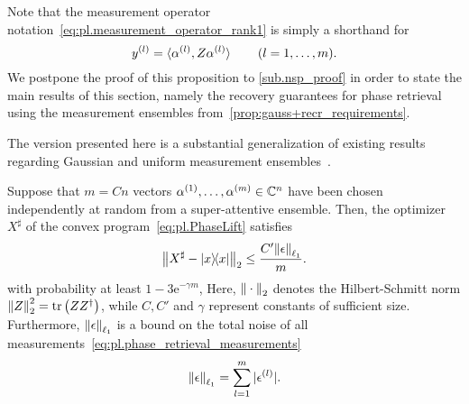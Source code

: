 Note that the measurement operator notation~\eqref{eq:pl.measurement_operator_rank1} is simply a shorthand for
\[
  y^{(l)} = \braket{\alpha^{(l)}, Z\alpha^{(l)}} \quad\quad (l=1,\ldots,m).
\]
We postpone the proof of this proposition to \cref{sub.nsp_proof} in order to state the main results of this section, namely the recovery guarantees for phase retrieval using the measurement ensembles from~\cref{prop:gauss+recr_requirements}.

The version presented here is a substantial generalization of existing results regarding Gaussian and uniform measurement ensembles~\cite{Candes_2012_Solving,Demanet_2014_Stable}.

\begin{theorem}%
  \label{thm:pl.phaselift_noisy}
  Suppose that $m = Cn$ vectors $\alpha^{(1)},\ldots,\alpha^{(m)} \in \mathbb{C}^n$ have been chosen independently at random from a super-attentive ensemble.
  Then, the optimizer $X^\sharp$ of the convex program~\eqref{eq:pl.PhaseLift} satisfies
  \[
    \Fnorm{{X}^\sharp - \ketbra{x}} \leq \frac{C'  \norm{\epsilon}_{\ell_1}}{m}.
    \label{eq:pl.noisy_recovery_bound}
  \]
  with probability at least $1 - 3\mathrm{e}^{-\gamma m}$,
  Here, ${\Vert\cdot\Vert}_{2}$ denotes the Hilbert-Schmitt norm ${\Vert Z\Vert}_{2}^2 = \operatorname{tr} \left( {Z} {Z}^\dagger \right)$, while $C,C'$ and $\gamma$ represent constants of sufficient size.
  Furthermore, ${\Vert\epsilon\Vert}_{\ell_1}$ is a bound on the total noise of all measurements~\eqref{eq:pl.phase_retrieval_measurements}
  \[
    {\Vert\epsilon\Vert}_{\ell_1} = \sum_{l=1}^m {\vert\epsilon^{(l)}\vert}.
    \label{eq:pl.phaselift_noisy.noise_bound}
  \]
\end{theorem}

